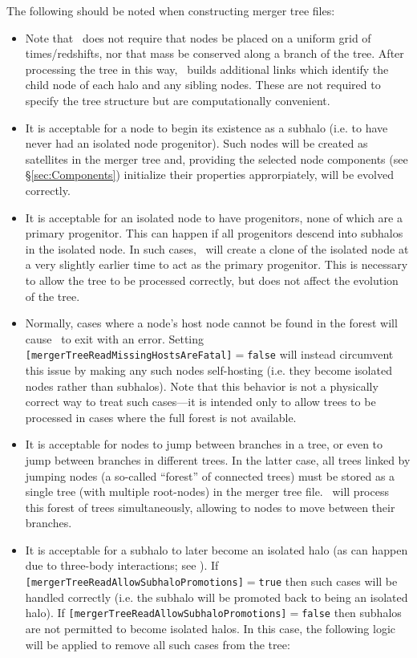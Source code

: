 The following should be noted when constructing merger tree files:
\begin{itemize}
\item Note that \glc\ does not require that nodes be placed on a uniform grid of times/redshifts, nor that mass be conserved along a branch of the tree. After processing the tree in this way, \glc\ builds additional links which identify the child node of each halo and any sibling nodes. These are not required to specify the tree structure but are computationally convenient.
\item It is acceptable for a node to begin its existence as a subhalo (i.e. to have never had an isolated node progenitor). Such nodes will be created as satellites in the merger tree and, providing the selected node components (see \S\ref{sec:Components}) initialize their properties approrpiately, will be evolved correctly.
\item It is acceptable for an isolated node to have progenitors, none of which are a primary progenitor. This can happen if all progenitors descend into subhalos in the isolated node. In such cases, \glc\ will create a clone of the isolated node at a very slightly earlier time to act as the primary progenitor. This is necessary to allow the tree to be processed correctly, but does not affect the evolution of the tree.
\item Normally, cases where a node's host node cannot be found in the \gls{forest} will cause \glc\ to exit with an error. Setting {\tt [mergerTreeReadMissingHostsAreFatal]}$=${\tt false} will instead circumvent this issue by making any such nodes self-hosting (i.e. they become isolated nodes rather than subhalos). Note that this behavior is not a physically correct way to treat such cases---it is intended only to allow trees to be processed in cases where the full \gls{forest} is not available.
\item It is acceptable for nodes to jump between branches in a tree, or even to jump between branches in different trees. In the latter case, all trees linked by jumping nodes (a so-called ``\gls{forest}'' of connected trees) must be stored as a single tree (with multiple root-nodes) in the merger tree file. \glc\ will process this \gls{forest} of trees simultaneously, allowing to nodes to move between their branches.
\item It is acceptable for a subhalo to later become an isolated halo (as can happen due to three-body interactions; see  \citealt{sales_cosmic_2007}). If {\tt [mergerTreeReadAllowSubhaloPromotions]}$=${\tt true} then such cases will be handled correctly (i.e. the subhalo will be promoted back to being an isolated halo). If {\tt [mergerTreeReadAllowSubhaloPromotions]}$=${\tt false} then subhalos are not permitted to become isolated halos. In this case, the following logic will be applied to remove all such cases from the tree:\\


\end{itemize}
